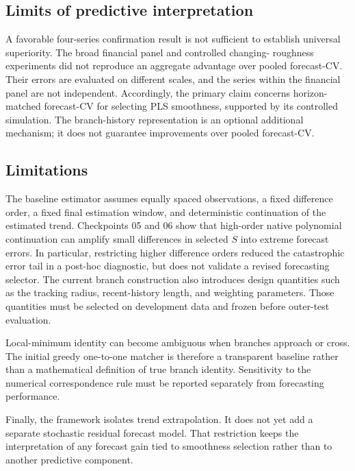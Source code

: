 \subsection{Limits of predictive interpretation}

A favorable four-series confirmation result is not sufficient to establish
universal superiority. The broad financial panel and controlled changing-
roughness experiments did not reproduce an aggregate advantage over
pooled forecast-CV. Their errors are evaluated on different scales, and
the series within the financial panel are not independent.
Accordingly, the primary claim concerns horizon-matched forecast-CV for
selecting PLS smoothness, supported by its controlled simulation.
The branch-history representation is an optional additional mechanism;
it does not guarantee improvements over pooled forecast-CV.

\subsection{Limitations}

The baseline estimator assumes equally spaced observations, a fixed difference order, a fixed final estimation window, and deterministic continuation of the estimated trend. Checkpoints 05 and 06 show that high-order native polynomial continuation can amplify small differences in selected $S$ into extreme forecast errors. In particular, restricting higher difference orders reduced the catastrophic error tail in a post-hoc diagnostic, but does not validate a revised forecasting selector. The current branch construction also introduces design quantities such as the tracking radius, recent-history length, and weighting parameters. Those quantities must be selected on development data and frozen before outer-test evaluation.

Local-minimum identity can become ambiguous when branches approach or cross. The initial greedy one-to-one matcher is therefore a transparent baseline rather than a mathematical definition of true branch identity. Sensitivity to the numerical correspondence rule must be reported separately from forecasting performance.

Finally, the framework isolates trend extrapolation. It does not yet add a separate stochastic residual forecast model. That restriction keeps the interpretation of any forecast gain tied to smoothness selection rather than to another predictive component.

